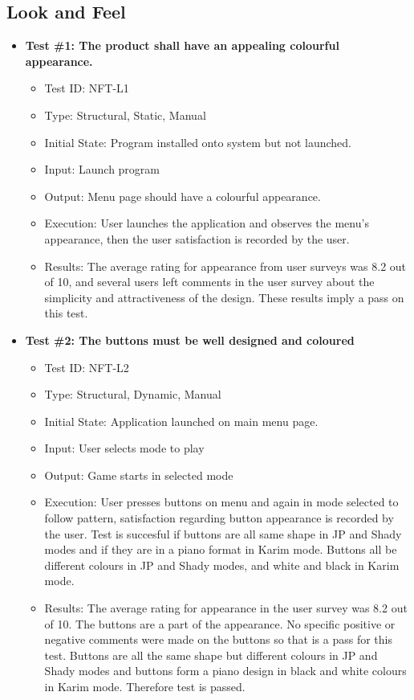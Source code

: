 \documentclass[12pt, titlepage]{article}
\begin{document}
\subsection{Look and Feel}
\begin{itemize}
\item \textbf{Test \#1: The product shall have an appealing colourful appearance.}
\begin{itemize}
\item Test ID: NFT-L1
\item Type: Structural, Static, Manual				
\item Initial State: Program installed onto system but not launched.		
\item Input: Launch program
\item Output: Menu page should have a colourful appearance.		
\item Execution: User launches the application and observes the menu's appearance, then the user satisfaction is recorded by the user.
\item Results: The average rating for appearance from user surveys was 8.2 out of 10, and several users left comments in the user survey about the simplicity and attractiveness of the design. These results imply a pass on this test.
\end{itemize}

\item \textbf{Test \#2: The buttons must be well designed and coloured}
\begin{itemize}
\item Test ID: NFT-L2
\item Type: Structural, Dynamic, Manual			
\item Initial State: Application launched on main menu page.			
\item Input: User selects mode to play			
\item Output: Game starts in selected mode				
\item Execution: User presses buttons on menu and again in mode selected to follow pattern, satisfaction regarding button appearance is recorded by the user. Test is succesful if buttons are all same shape in JP and Shady modes and if they are in a piano format in Karim mode. Buttons all be different colours in JP and Shady modes, and white and black in Karim mode.
\item Results: The average rating for appearance in the user survey was 8.2 out of 10. The buttons are a part of the appearance. No specific positive or negative comments were made on the buttons so that is a pass for this test. Buttons are all the same shape but different colours in JP and Shady modes and buttons form a piano design in black and white colours in Karim mode. Therefore test is passed.
\end{itemize}


\end{itemize}
\end{document}
